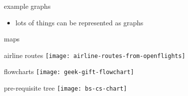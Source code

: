 \begin{frame}{example graphs}
\begin{itemize}
\item lots of things can be represented as graphs
\end{itemize}
\end{frame}

\begin{frame}{maps}
\end{frame}

\begin{frame}{airline routes}
\texttt{[image: airline-routes-from-openflights]}
\end{frame}

\begin{frame}{flowcharts}
\texttt{[image: geek-gift-flowchart]}
\end{frame}

\begin{frame}{pre-requisite tree}
\texttt{[image: bs-cs-chart]}
\end{frame}
